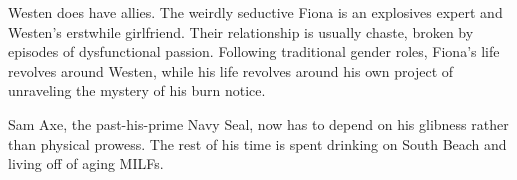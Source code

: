 Westen does have allies. The weirdly seductive Fiona is an explosives expert and Westen's erstwhile girlfriend. Their relationship is usually chaste, broken by episodes of dysfunctional passion. Following traditional gender roles, Fiona's life revolves around Westen, while his life revolves around his own project of unraveling the mystery of his burn notice.

Sam Axe, the past-his-prime Navy Seal, now has to depend on his glibness rather than physical prowess. The rest of his time is spent drinking on South Beach and living off of aging MILFs.




